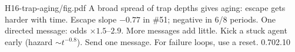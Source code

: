 {H16-trap-aging/fig.pdf}
{A broad spread of trap depths gives aging: escape gets harder with time.}
{Escape slope $-0.77$ in \#51; negative in 6/8 periods. One directed message: odds $\times1.5$--$2.9$. More messages add little.}
{Kick a stuck agent early (hazard $\sim t^{-0.8}$). Send one message. For failure loops, use a reset.}
{0.70}{2.10}
